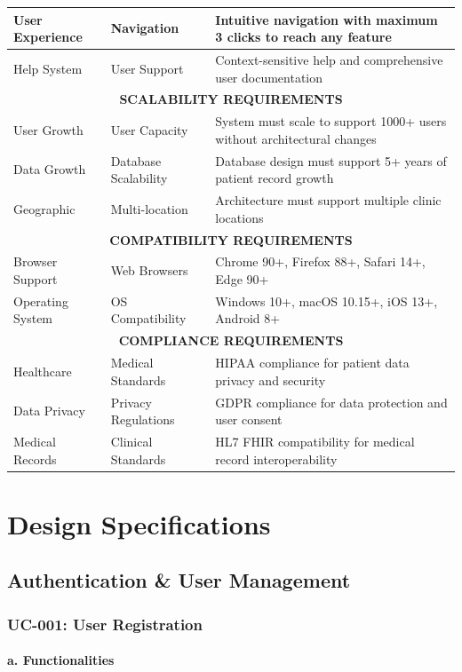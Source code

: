 \documentclass[12pt,a4paper]{article}
\begin{document}
\begin{longtable}{|p{2.5cm}|p{4cm}|p{7.5cm}|}
\hline
User Experience & Navigation & Intuitive navigation with maximum 3 clicks to reach any feature \\
\hline
Help System & User Support & Context-sensitive help and comprehensive user documentation \\
\hline
\multicolumn{3}{|c|}{\textbf{SCALABILITY REQUIREMENTS}} \\
\hline
User Growth & User Capacity & System must scale to support 1000+ users without architectural changes \\
\hline
Data Growth & Database Scalability & Database design must support 5+ years of patient record growth \\
\hline
Geographic & Multi-location & Architecture must support multiple clinic locations \\
\hline
\multicolumn{3}{|c|}{\textbf{COMPATIBILITY REQUIREMENTS}} \\
\hline
Browser Support & Web Browsers & Chrome 90+, Firefox 88+, Safari 14+, Edge 90+ \\
\hline
Operating System & OS Compatibility & Windows 10+, macOS 10.15+, iOS 13+, Android 8+ \\
\hline
\multicolumn{3}{|c|}{\textbf{COMPLIANCE REQUIREMENTS}} \\
\hline
Healthcare & Medical Standards & HIPAA compliance for patient data privacy and security \\
\hline
Data Privacy & Privacy Regulations & GDPR compliance for data protection and user consent \\
\hline
Medical Records & Clinical Standards & HL7 FHIR compatibility for medical record interoperability \\
\hline
\end{longtable}

\section{Design Specifications}

\subsection{Authentication \& User Management}

\subsubsection{UC-001: User Registration}

\paragraph{a. Functionalities}
\end{document}
